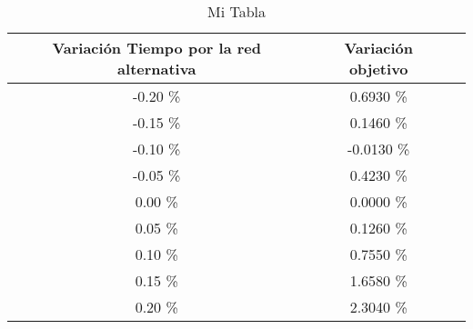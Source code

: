 \begin{table}
\centering
\begin{tabular}{|c|c|c|}
\hline
 Variación Tiempo por la red alternativa & Variación objetivo \\ \hline
-0.20 \% & 0.6930 \% \\ \hline
-0.15 \% & 0.1460 \% \\ \hline
-0.10 \% & -0.0130 \% \\ \hline
-0.05 \% & 0.4230 \% \\ \hline
0.00 \% & 0.0000 \% \\ \hline
0.05 \% & 0.1260 \% \\ \hline
0.10 \% & 0.7550 \% \\ \hline
0.15 \% & 1.6580 \% \\ \hline
0.20 \% & 2.3040 \% \\ \hline
\end{tabular}
\caption{Mi Tabla}
\end{table}

